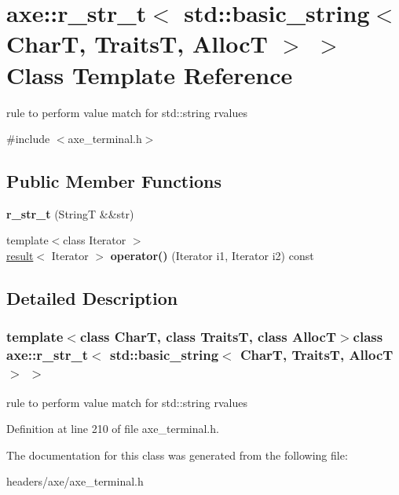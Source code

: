 \hypertarget{classaxe_1_1r__str__t_3_01std_1_1basic__string_3_01CharT_00_01TraitsT_00_01AllocT_01_4_01_4}{\section{axe\+:\+:r\+\_\+str\+\_\+t$<$ std\+:\+:basic\+\_\+string$<$ Char\+T, Traits\+T, Alloc\+T $>$ $>$ Class Template Reference}
\label{classaxe_1_1r__str__t_3_01std_1_1basic__string_3_01CharT_00_01TraitsT_00_01AllocT_01_4_01_4}
}


rule to perform value match for std\+::string rvalues  




{\ttfamily \#include $<$axe\+\_\+terminal.\+h$>$}

\subsection*{Public Member Functions}
\begin{DoxyCompactItemize}
\item 
\hypertarget{classaxe_1_1r__str__t_3_01std_1_1basic__string_3_01CharT_00_01TraitsT_00_01AllocT_01_4_01_4_af963f1df04792b815259e633b0d586cb}{{\bfseries r\+\_\+str\+\_\+t} (String\+T \&\&str)}\label{classaxe_1_1r__str__t_3_01std_1_1basic__string_3_01CharT_00_01TraitsT_00_01AllocT_01_4_01_4_af963f1df04792b815259e633b0d586cb}

\item 
\hypertarget{classaxe_1_1r__str__t_3_01std_1_1basic__string_3_01CharT_00_01TraitsT_00_01AllocT_01_4_01_4_ac87e530ee54d3315788f0848fdb75e2c}{{\footnotesize template$<$class Iterator $>$ }\\\hyperlink{structaxe_1_1result}{result}$<$ Iterator $>$ {\bfseries operator()} (Iterator i1, Iterator i2) const }\label{classaxe_1_1r__str__t_3_01std_1_1basic__string_3_01CharT_00_01TraitsT_00_01AllocT_01_4_01_4_ac87e530ee54d3315788f0848fdb75e2c}

\end{DoxyCompactItemize}


\subsection{Detailed Description}
\subsubsection*{template$<$class Char\+T, class Traits\+T, class Alloc\+T$>$class axe\+::r\+\_\+str\+\_\+t$<$ std\+::basic\+\_\+string$<$ Char\+T, Traits\+T, Alloc\+T $>$ $>$}

rule to perform value match for std\+::string rvalues 

Definition at line 210 of file axe\+\_\+terminal.\+h.



The documentation for this class was generated from the following file\+:\begin{DoxyCompactItemize}
\item 
headers/axe/axe\+\_\+terminal.\+h\end{DoxyCompactItemize}
